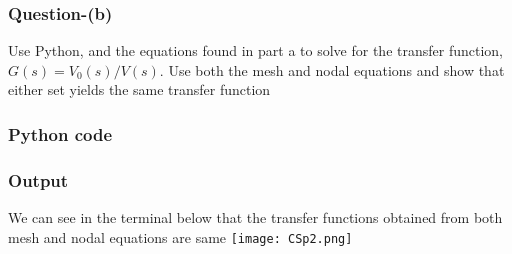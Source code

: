 \documentclass[aspectratio=43]{beamer}
\theoremstyle{remark}
\numberwithin{equation}{section}
\begin{document}
\begin{frame}
\frametitle{Question-(b)}
Use Python, and the equations found in part a to solve for the transfer function, $G(s) = V_0(s)/V(s)$. Use both the mesh and nodal equations and show that either set yields the same transfer function
\end{frame}
\begin{frame}
\frametitle{Python code}

\end{frame}
\begin{frame}
\frametitle{Output}
We can see in the terminal below that the transfer functions obtained from both mesh and nodal equations are same
\texttt{[image: CSp2.png]}
\end{frame}
\end{document}
